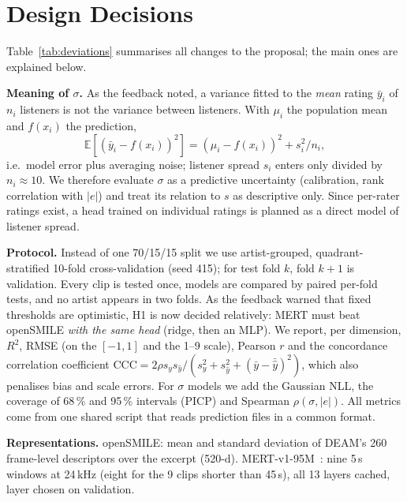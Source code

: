 \documentclass[conference]{IEEEtran}
\newcommand{\R}{R^2}
\begin{document}
\section{Design Decisions}
Table~\ref{tab:deviations} summarises all changes to the proposal; the main
ones are explained below.



\textbf{Meaning of $\sigma$.} As the feedback noted, a variance fitted to the
\emph{mean} rating $\bar y_i$ of $n_i$ listeners is not the variance between
listeners. With $\mu_i$ the population mean and $f(x_i)$ the prediction,
\begin{equation}
\mathbb{E}[(\bar y_i - f(x_i))^2] = (\mu_i - f(x_i))^2 + s_i^2/n_i ,
\label{eq:sigma}
\end{equation}
i.e.\ model error plus averaging noise; listener spread $s_i$ enters only
divided by $n_i\approx10$. We therefore evaluate $\sigma$ as a predictive
uncertainty (calibration, rank correlation with $|e|$) and treat its relation
to $s$ as descriptive only. Since per-rater ratings exist, a head trained on
individual ratings is planned as a direct model of listener spread.

\textbf{Protocol.} Instead of one 70/15/15 split we use artist-grouped,
quadrant-stratified 10-fold cross-validation (seed 415); for test fold $k$,
fold $k{+}1$ is validation. Every clip is tested once, models are compared by
paired per-fold tests, and no artist appears in two folds. As the feedback
warned that fixed thresholds are optimistic, H1 is now decided relatively:
MERT must beat openSMILE \emph{with the same head} (ridge, then an MLP). We
report, per dimension, $\R$, RMSE (on the $[-1,1]$ and the 1--9 scale),
Pearson $r$ and the concordance correlation coefficient
$\mathrm{CCC}=2\rho s_y s_{\hat y}/(s_y^2+s_{\hat y}^2+(\bar y-\bar{\hat y})^2)$,
which also penalises bias and scale errors. For $\sigma$ models we add the
Gaussian NLL, the coverage of 68\,\% and 95\,\% intervals (PICP) and
Spearman $\rho(\sigma,|e|)$. All metrics come from one shared script that reads
prediction files in a common format.

\textbf{Representations.} openSMILE: mean and standard deviation of DEAM's 260
frame-level descriptors over the excerpt (520-d). MERT-v1-95M~\cite{li2024mert}: nine 5\,s
windows at 24\,kHz (eight for the 9 clips shorter than 45\,s), all 13 layers cached, layer chosen on validation.
\end{document}
